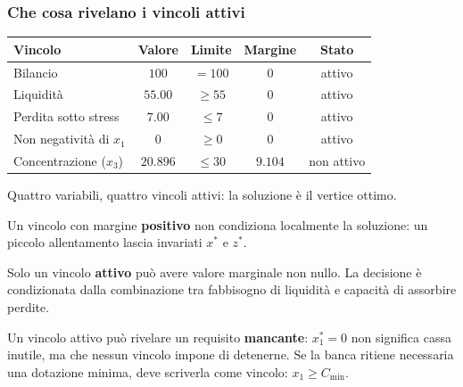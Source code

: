 \begin{frame}%


%

\frametitle{Che cosa rivelano i vincoli attivi}%
%

%


\begin{center}
{\small
\begin{tabular}
[c]{lcccc}\hline
\textbf{Vincolo} & \textbf{Valore} & \textbf{Limite} & \textbf{Margine} &
\textbf{Stato}\\\hline
Bilancio & $100$ & $=100$ & $0$ & attivo\\
Liquidit\`{a} & $55.00$ & $\geq55$ & $0$ & attivo\\
Perdita sotto stress & $7.00$ & $\leq7$ & $0$ & attivo\\
Non negativit\`{a} di $x_{1}$ & $0$ & $\geq0$ & $0$ & attivo\\
Concentrazione ($x_{3}$) & $20.896$ & $\leq30$ & $9.104$ & non attivo\\\hline
\end{tabular}
}
\end{center}

\medskip

Quattro variabili, quattro vincoli attivi: la soluzione \`{e} il vertice ottimo.

\medskip

\begin{stepitemize}
\item Un vincolo con margine \textbf{positivo} non condiziona localmente la
soluzione: un piccolo allentamento lascia invariati $x^{*}$ e $z^{*}$.



\item Solo un vincolo \textbf{attivo} pu\`{o} avere valore marginale non
nullo. La decisione \`{e} condizionata dalla combinazione tra fabbisogno di
liquidit\`{a} e capacit\`{a} di assorbire perdite.

\item Un vincolo attivo pu\`{o} rivelare un requisito \textbf{mancante}:
$x_{1}^{*}=0$ non significa cassa inutile, ma che nessun vincolo impone di
detenerne. Se la banca ritiene necessaria una dotazione minima, deve scriverla
come vincolo: $x_{1}\geq C_{\min}$.
\end{stepitemize}

%

\transboxout
\end{frame}%


